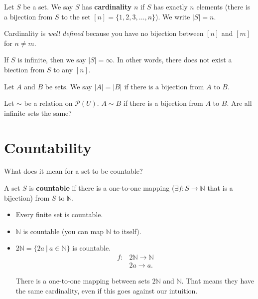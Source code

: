 \documentclass[a4paper]{article}
\begin{document}
\begin{definition}
	Let \( S \) be a set. We say \( S \) has \textbf{cardinality} \( n \) if \( S \) has exactly \( n \) elements (there is a bijection from \( S \) to the set \( [n]=\{1, 2, 3, \ldots , n\}   \)). We write \( |S|=n \).
\end{definition}
\begin{remark}
	Cardinality is \textit{well defined} because you have no bijection between \( [n] \) and \( [m] \) for \( n \neq  m \).
\end{remark}
\begin{remark}
	If \( S \) is infinite, then we say \( |S| = \infty \). In other words, there does not exist a biection from \( S \) to any \( [n] \).
\end{remark}

\begin{definition}
	Let \( A \) and \( B \) be sets. We say \( |A| = |B| \) if there is a bijection from \( A \) to \( B \).
\end{definition}

\begin{eg}
	Let \( \sim \) be a relation on \( \mathcal{P}(U) \). \( A \sim B \) if there is a bijection from \( A \) to \( B \). Are all infinite sets the same?
\end{eg}

\section{Countability}
What does it mean for a set to be countable?

\begin{definition}
	A set \( S \) is \textbf{countable} if there is a one-to-one mapping (\( \exists f \colon S \to \mathbb{N} \) that is a bijection) from \( S \) to \( \mathbb{N} \).
\end{definition}
\begin{itemize}
	\item Every finite set is countable.
	\item \( \mathbb{N} \) is countable (you can map \( \mathbb{N} \) to itself).
	\item \( 2 \mathbb{N} = \{2a ~|~ a \in  \mathbb{N}\}   \) is countable.
		\begin{align*}
			f \colon & 2 \mathbb{N} \to  \mathbb{N} \\
							 & 2a \to a
		.\end{align*}
		\begin{remark}
			There is a one-to-one mapping between sets \( 2\mathbb{N} \) and \( \mathbb{N} \). That means they have the same cardinality, even if this goes against our intuition.
		\end{remark}
\end{itemize}
\end{document}
